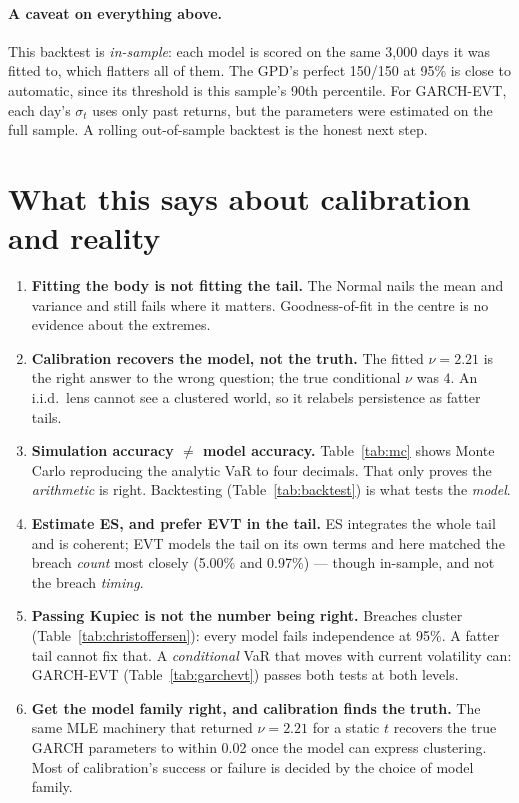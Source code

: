 \documentclass[11pt]{article}
\begin{document}
\paragraph{A caveat on everything above.} This backtest is \emph{in-sample}:
each model is scored on the same 3{,}000 days it was fitted to, which flatters
all of them. The GPD's perfect 150/150 at 95\% is close to automatic, since
its threshold is this sample's 90th percentile. For GARCH-EVT, each day's
$\sigma_t$ uses only past returns, but the parameters were estimated on the
full sample. A rolling out-of-sample backtest is the honest next step.

\section{What this says about calibration and reality}
\begin{enumerate}[leftmargin=1.6em]
  \item \textbf{Fitting the body is not fitting the tail.} The Normal nails the
        mean and variance and still fails where it matters. Goodness-of-fit in
        the centre is no evidence about the extremes.
  \item \textbf{Calibration recovers the model, not the truth.} The fitted
        $\nu=2.21$ is the right answer to the wrong question; the true
        conditional $\nu$ was $4$. An i.i.d.\ lens cannot see a clustered world,
        so it relabels persistence as fatter tails.
  \item \textbf{Simulation accuracy $\ne$ model accuracy.} Table~\ref{tab:mc}
        shows Monte Carlo reproducing the analytic VaR to four decimals. That
        only proves the \emph{arithmetic} is right. Backtesting
        (Table~\ref{tab:backtest}) is what tests the \emph{model}.
  \item \textbf{Estimate ES, and prefer EVT in the tail.} ES integrates the
        whole tail and is coherent; EVT models the tail on its own terms and
        here matched the breach \emph{count} most closely (5.00\% and 0.97\%) --- though
        in-sample, and not the breach \emph{timing}.
  \item \textbf{Passing Kupiec is not the number being right.} Breaches
        cluster (Table~\ref{tab:christoffersen}): every model fails independence
        at 95\%. A fatter tail cannot fix that. A \emph{conditional} VaR that
        moves with current volatility can: GARCH-EVT
        (Table~\ref{tab:garchevt}) passes both tests at both levels.
  \item \textbf{Get the model family right, and calibration finds the truth.}
        The same MLE machinery that returned $\nu=2.21$ for a static $t$ recovers
        the true GARCH parameters to within 0.02 once the model can express
        clustering. Most of calibration's success or failure is decided by the
        choice of model family.
\end{enumerate}
\end{document}
